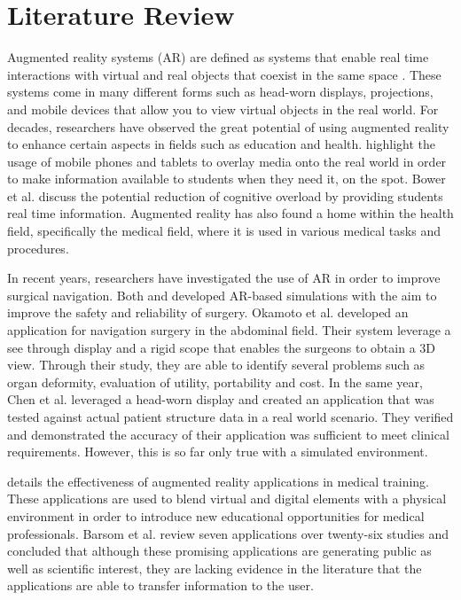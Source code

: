 \section{Literature Review}
\label{sec:literaturereview}
Augmented reality systems (AR) are defined as systems that enable real time interactions with virtual and real objects that coexist in the same space \cite{Azuma1997}. These systems come in many different forms such as head-worn displays, projections, and mobile devices that allow you to view virtual objects in the real world. For decades, researchers have observed the great potential of using augmented reality to enhance certain aspects in fields such as education and health. \cite{Bower2014} highlight the usage of mobile phones and tablets to overlay media onto the real world in order to make information available to students when they need it, on the spot. Bower et al. discuss the potential reduction of cognitive overload by providing students real time information. Augmented reality has also found a home within the health field, specifically the medical field, where it is used in various medical tasks and procedures.

In recent years, researchers have investigated the use of AR in order to improve surgical navigation. Both \cite{Okamoto2015} and \cite{Chen2015} developed AR-based simulations with the aim to improve the safety and reliability of surgery. Okamoto et al. developed an application for navigation surgery in the abdominal field. Their system leverage a see through display and a rigid scope that enables the surgeons to obtain a 3D view. Through their study, they are able to identify several problems such as organ deformity, evaluation of utility, portability and cost. In the same year, Chen et al. leveraged a head-worn display and created an application that was tested against actual patient structure data in a real world scenario. They verified and demonstrated the accuracy of their application was sufficient to meet clinical requirements. However, this is so far only true with a simulated environment. 

\cite{Barsom2016} details the effectiveness of augmented reality applications in medical training. These applications are used to blend virtual and digital elements with a physical environment in order to introduce new educational opportunities for medical professionals. Barsom et al. review seven applications over twenty-six studies and concluded that although these promising applications are generating public as well as scientific interest, they are lacking evidence in the literature that the applications are able to transfer information to the user.

